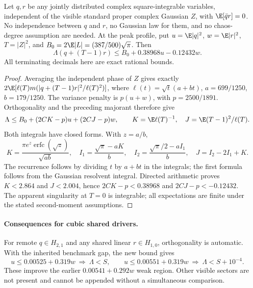 \begin{theorem}\label{thm:shared-a-audit}
Let $q,r$ be any jointly distributed complex square-integrable variables,
independent of the visible standard proper complex Gaussian $Z$, with
$\E[\bar q r]=0$. No independence between $q$ and $r$, no Gaussian law
for them, and no chaos-degree assumption are needed. At the peak profile,
put $u=\E|q|^2$, $w=\E|r|^2$, $T=|Z|^2$, and
$B_0=2\E|L|=(387/500)\sqrt\pi$. Then
\begin{equation}\label{eq:shared-a-audit}
 \boxed{\Lambda(q+(T-1)r)
       \le B_0+0.38968u-0.12432w.}
\end{equation}
All terminating decimals here are exact rational bounds.
\end{theorem}
\begin{proof}
Averaging the independent phase of $Z$ gives exactly
$2\E[\ell(T)m(|q+(T-1)r|^2/\ell(T)^2)]$, where
$\ell(t)=\sqrt t(a+bt)$, $a=699/1250$, $b=179/1250$.
The variance penalty is $p(u+w)$, with $p=2500/1891$.
Orthogonality and the preceding majorant therefore give
\[
 \Lambda\le B_0+(2CK-p)u+(2CJ-p)w,
 \qquad K=\E\ell(T)^{-1},\quad J=\E (T-1)^2/\ell(T).
\]
Both integrals have closed forms. With $z=a/b$,
\[
 K=\frac{\pi e^z\operatorname{erfc}(\sqrt z)}{\sqrt{ab}},\quad
 I_1=\frac{\sqrt\pi-aK}{b},\quad
 I_2=\frac{\sqrt\pi/2-aI_1}{b},\quad J=I_2-2I_1+K.
\]
The recurrence follows by dividing $t$ by $a+bt$ in the integrals;
the first formula follows from the Gaussian resolvent integral.
Directed arithmetic proves $K<2.864$ and $J<2.004$, hence
$2CK-p<0.38968$ and $2CJ-p<-0.12432$.
The apparent singularity at $T=0$ is integrable; all expectations are
finite under the stated second-moment assumptions.
\end{proof}

\paragraph{Consequences for cubic shared drivers.}
For remote $q\in H_{2,1}$ and any shared linear $r\in H_{1,0}$,
orthogonality is automatic. With the inherited benchmark gap, the new
bound gives
\[
 \boxed{u\le0.00525+0.319w\ \Longrightarrow\ \Lambda<S,}
 \qquad
 \boxed{u\le0.00551+0.319w\ \Longrightarrow\ \Lambda<S+10^{-4}.}
\]
These improve the earlier $0.00541+0.292w$ weak region. Other visible
sectors are not present and cannot be appended without a simultaneous comparison.

